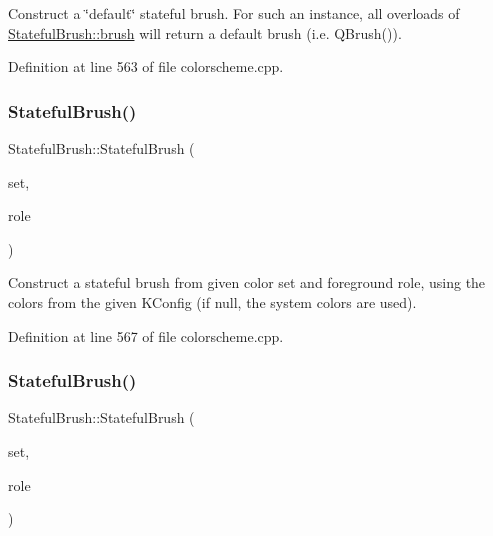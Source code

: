 Construct a \char`\"{}default\char`\"{} stateful brush. For such an instance, all overloads of \hyperlink{class_stateful_brush_a7019e41f2932aafcefcce57623c4fb2c}{Stateful\+Brush\+::brush} will return a default brush (i.\+e. {\ttfamily Q\+Brush()}). 

Definition at line 563 of file colorscheme.\+cpp.

\mbox{\label{class_stateful_brush_ab2d1bb4316d486ec896f4cad2ae001f2}} 
\subsubsection{\texorpdfstring{Stateful\+Brush()}{StatefulBrush()}\hspace{0.1cm}{\footnotesize\ttfamily [2/7]}}
{\footnotesize\ttfamily Stateful\+Brush\+::\+Stateful\+Brush (\begin{DoxyParamCaption}\item[{\hyperlink{class_color_scheme_a56ea451e86dffa1822ed087902844e05}{Color\+Scheme\+::\+Color\+Set}}]{set,  }\item[{\hyperlink{class_color_scheme_ab0f331e829838e82757088db8ce32ab4}{Color\+Scheme\+::\+Foreground\+Role}}]{role }\end{DoxyParamCaption})\hspace{0.3cm}{\ttfamily [explicit]}}

Construct a stateful brush from given color set and foreground role, using the colors from the given K\+Config (if null, the system colors are used). 

Definition at line 567 of file colorscheme.\+cpp.

\mbox{\label{class_stateful_brush_a37722e1db380bec60352a6088cb1aa5b}} 
\subsubsection{\texorpdfstring{Stateful\+Brush()}{StatefulBrush()}\hspace{0.1cm}{\footnotesize\ttfamily [3/7]}}
{\footnotesize\ttfamily Stateful\+Brush\+::\+Stateful\+Brush (\begin{DoxyParamCaption}\item[{\hyperlink{class_color_scheme_a56ea451e86dffa1822ed087902844e05}{Color\+Scheme\+::\+Color\+Set}}]{set,  }\item[{\hyperlink{class_color_scheme_a70715e73df1fb0f140797633f8043a8c}{Color\+Scheme\+::\+Background\+Role}}]{role }\end{DoxyParamCaption})\hspace{0.3cm}{\ttfamily [explicit]}}

